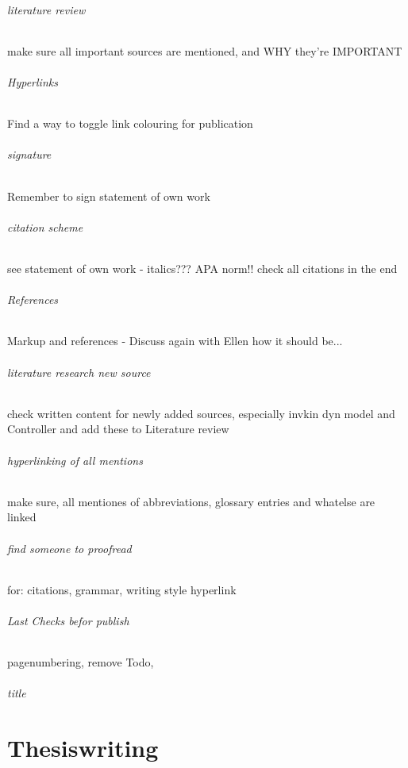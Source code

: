 \paragraph{literature review}
make sure all important sources are mentioned, and WHY they're IMPORTANT

\paragraph{Hyperlinks}
Find a way to toggle link colouring for publication

\paragraph{signature}
Remember to sign statement of own work

\paragraph{citation scheme}
see statement of own work - italics???
APA norm!! check all citations in the end
\paragraph{References}
Markup and references - Discuss again with Ellen how it should be...

\paragraph{literature research new source}
check written content for newly added sources, especially invkin dyn model and Controller and add these to Literature review

\paragraph{hyperlinking of all mentions}
make sure, all mentiones of abbreviations, glossary entries and whatelse are linked

\paragraph{find someone to proofread}
for:
citations,
grammar,
writing style
hyperlink

\paragraph{Last Checks befor publish}
pagenumbering,
remove Todo,

\paragraph{title}


\cleardoublepage
\part{Thesiswriting}
\cleardoublepage